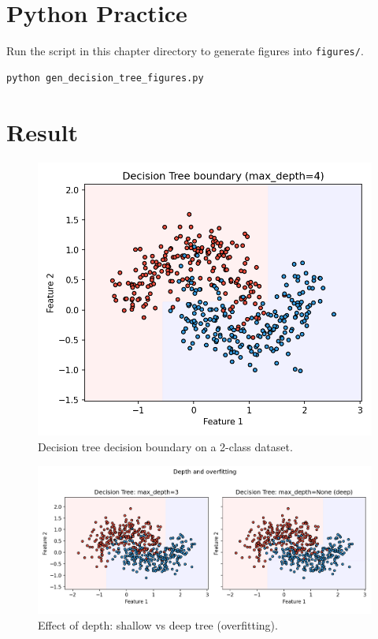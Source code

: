 \documentclass[11pt]{article}
\begin{document}
\section{Python Practice}
Run the script in this chapter directory to generate figures into \texttt{figures/}.
\begin{lstlisting}[style=code,caption={Generate Decision Tree figures},label={lst:genfigs_dt}]
python gen_decision_tree_figures.py
\end{lstlisting}





\section{Result}
\begin{figure}[H]
  \centering
  \includegraphics[width=0.9\linewidth]{dt_decision_boundary_2class.png}
  \caption{Decision tree decision boundary on a 2-class dataset.}
  \label{fig:dt2}
\end{figure}
\FloatBarrier

\begin{figure}[H]
  \centering
  \includegraphics[width=0.95\linewidth]{dt_depth_compare.png}
  \caption{Effect of depth: shallow vs deep tree (overfitting).}
  \label{fig:depth}
\end{figure}
\FloatBarrier
\end{document}
